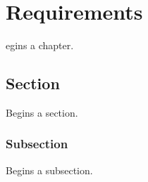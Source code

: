 \let\textcircled=\pgftextcircled
\chapter{Requirements}
\label{chap:requirements}

egins a chapter. 

\section{Section}
\label{sec:sec01}

Begins a section.

\subsection{Subsection}
\label{subsec:subsec01}

Begins a subsection.